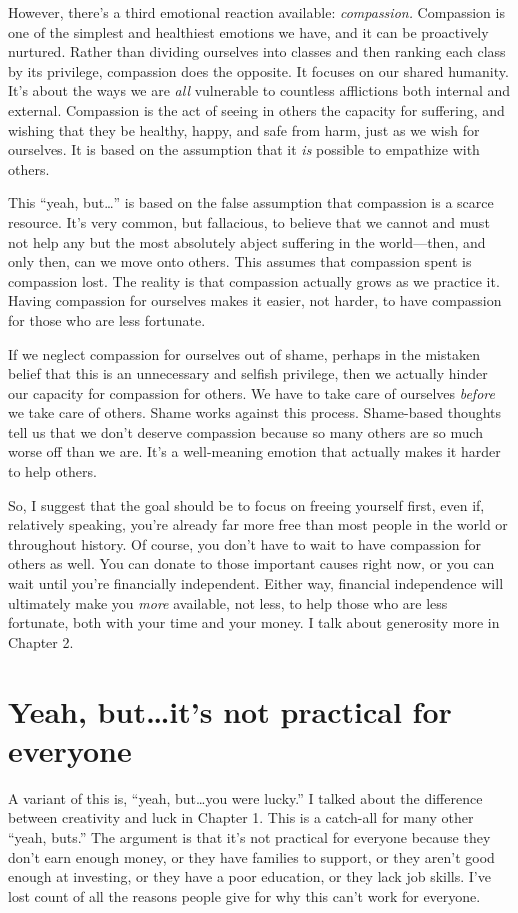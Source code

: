 However, there's a third emotional reaction available: \emph{compassion.} Compassion is one of the simplest and healthiest emotions we have, and it can be proactively nurtured. Rather than dividing ourselves into classes and then ranking each class by its privilege, compassion does the opposite. It focuses on our shared humanity. It's about the ways we are \emph{all} vulnerable to countless afflictions both internal and external. Compassion is the act of seeing in others the capacity for suffering, and wishing that they be healthy, happy, and safe from harm, just as we wish for ourselves. It is based on the assumption that it \emph{is} possible to empathize with others.

This ``yeah, but\ldots'' is based on the false assumption that compassion is a scarce resource. It's very common, but fallacious, to believe that we cannot and must not help any but the most absolutely abject suffering in the world---then, and only then, can we move onto others. This assumes that compassion spent is compassion lost. The reality is that compassion actually grows as we practice it. Having compassion for ourselves makes it easier, not harder, to have compassion for those who are less fortunate.

If we neglect compassion for ourselves out of shame, perhaps in the mistaken belief that this is an unnecessary and selfish privilege, then we actually hinder our capacity for compassion for others. We have to take care of ourselves \emph{before} we take care of others. Shame works against this process. Shame-based thoughts tell us that we don't deserve compassion because so many others are so much worse off than we are. It's a well-meaning emotion that actually makes it harder to help others.

So, I suggest that the goal should be to focus on freeing yourself first, even if, relatively speaking, you're already far more free than most people in the world or throughout history. Of course, you don't have to wait to have compassion for others as well. You can donate to those important causes right now, or you can wait until you're financially independent. Either way, financial independence will ultimately make you \emph{more} available, not less, to help those who are less fortunate, both with your time and your money. I talk about generosity more in Chapter 2.

\section{Yeah, but\ldots it's not practical for everyone}
A variant of this is, ``yeah, but\ldots you were lucky.'' I talked about the difference between creativity and luck in Chapter 1. This is a catch-all for many other ``yeah, buts.'' The argument is that it's not practical for everyone because they don't earn enough money, or they have families to support, or they aren't good enough at investing, or they have a poor education, or they lack job skills. I've lost count of all the reasons people give for why this can't work for everyone.

